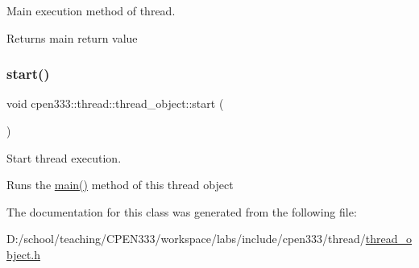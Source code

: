 Main execution method of thread. 

\begin{DoxyReturn}{Returns}
main return value 
\end{DoxyReturn}
\mbox{\label{classcpen333_1_1thread_1_1thread__object_ae4484909a3f4418c0c0db318d615bde1}} 
\subsubsection{\texorpdfstring{start()}{start()}}
{\footnotesize\ttfamily void cpen333\+::thread\+::thread\+\_\+object\+::start (\begin{DoxyParamCaption}{ }\end{DoxyParamCaption})\hspace{0.3cm}{\ttfamily [inline]}}



Start thread execution. 

Runs the \hyperlink{classcpen333_1_1thread_1_1thread__object_adbd74f6f7461d90a1c12e8078aa5f3af}{main()} method of this thread object 

The documentation for this class was generated from the following file\+:\begin{DoxyCompactItemize}
\item 
D\+:/school/teaching/\+C\+P\+E\+N333/workspace/labs/include/cpen333/thread/\hyperlink{thread__object_8h}{thread\+\_\+object.\+h}\end{DoxyCompactItemize}
